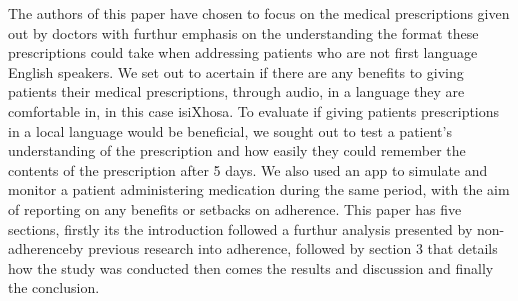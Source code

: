 The authors of this paper have chosen to focus on the medical prescriptions given out by doctors with furthur emphasis on the understanding the format these prescriptions could take when addressing patients who are not first language English speakers. We set out to acertain if there are any benefits to giving patients their medical prescriptions, through audio, in a language they are comfortable in, in this case isiXhosa. To evaluate if giving patients prescriptions in a local language would be beneficial, we sought out to test a patient's understanding of the prescription and how easily they could remember the contents of the prescription after 5 days. We also used an app to simulate and monitor a patient administering medication during the same period, with the aim of reporting on any benefits or setbacks on adherence. This paper has five sections, firstly its the introduction followed a furthur analysis presented by non-adherenceby previous research into adherence, followed by section 3 that details how the study was conducted then comes the results and discussion and finally the conclusion.
